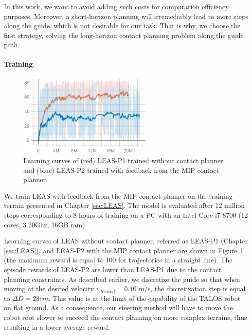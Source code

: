 In this work, we want to avoid adding such costs for computation efficiency purposes. 
Moreover, a short-horizon planning will irremediably lead to more steps along the guide, which is not desirable for our task.
That is why, we choose the first strategy, solving the long-horizon contact planning problem along the guide path.


\paragraph{Training.}
\begin{figure}[t]
    \centering
    \includegraphics[trim={0 0 0 0},clip,width=0.6\textwidth]{Figures/Chapter_MIP_SL1M/learning_curve_MIP_P1.png}
    \caption{Learning curves of (red) LEAS-P1 trained without contact planner and (blue) LEAS-P2 trained with feedback from the MIP contact planner.}
    \label{fig:mip:learning_curves}
\end{figure}
We train LEAS with feedback from the MIP contact planner on the training terrain presented in Chapter \ref{sec:LEAS}.
The model is evaluated after 12 million steps corresponding to 8 hours of training on a PC with an Intel Core i7-8700 (12 cores, 3.20Ghz, 16GB ram). 

Learning curves of LEAS without contact planner, referred as LEAS-P1 (Chapter \ref{sec:LEAS}), and LEAS-P2 with the MIP contact planner are shown in Figure \ref{fig:mip:learning_curves} (the maximum reward is equal to 100 for trajectories in a straight line).
The episode rewards of LEAS-P2 are lower than LEAS-P1 due to the contact planning constraints. 
As described earlier, we discretize the guide so that when moving at the desired velocity $v_{desired}=0.10$ m/s, the discretization step is equal to $\Delta D=28cm$. 
This value is at the limit of the capability of the TALOS robot on flat ground. 
As a consequence, our steering method will have to move the robot root slower to succeed the contact planning on more complex terrains, thus resulting in a lower average reward.


